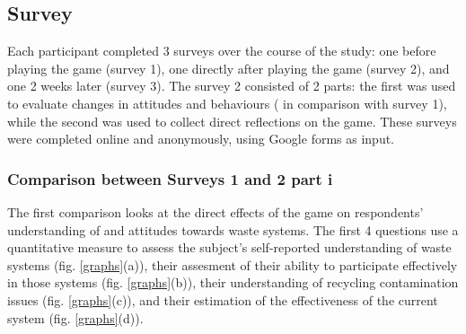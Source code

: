 \documentclass[nofonts,nols,justified,nobib]{tufte-book}
\begin{document}
\subsection*{Survey}
Each participant completed 3 surveys over the course of the study: one before playing the game (survey 1), one directly after playing the game (survey 2), and one 2 weeks later (survey 3). The survey 2 consisted of 2 parts: the first was used to evaluate changes in attitudes and behaviours ( in comparison with survey 1), while the second was used to collect direct reflections on the game. These surveys were completed online and anonymously, using Google forms as input. 

\subsubsection*{Comparison between Surveys 1 and 2 part i}
The first comparison looks at the direct effects of the game on respondents' understanding of and attitudes towards waste systems. The first 4 questions use a quantitative measure to assess the subject's self-reported understanding of waste systems (fig. \ref{graphs}(a)), their assesment of their ability to participate effectively in those systems (fig. \ref{graphs}(b)), their understanding of recycling contamination issues (fig. \ref{graphs}(c)), and their estimation of the effectiveness of the current system (fig. \ref{graphs}(d)).
\end{document}
